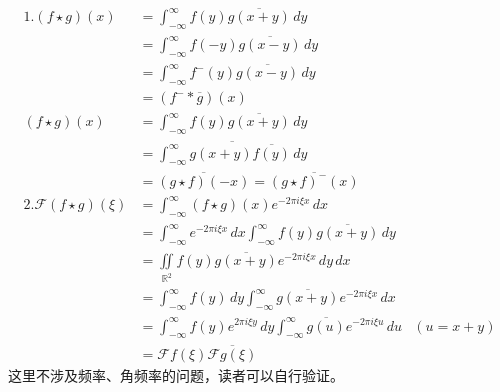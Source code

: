 \documentclass{ctexbook}
\begin{document}
\begin{align*}
    1.(f\star g)(x)               & =\int_{-\infty}^{\infty}f(y)\overline{g(x+y)}\,dy                                                                   \\
                                  & =\int_{-\infty}^{\infty}f(-y)\overline{g(x-y)}\,dy                                                                  \\
                                  & =\int_{-\infty}^{\infty}f^-(y)\overline{g(x-y)}\,dy                                                                 \\
                                  & = (f^- * \overline{g})(x)                                                                                           \\
    (f\star g)(x)                 & =\int_{-\infty}^{\infty}f(y)\overline{g(x+y)}\,dy                                                                   \\
                                  & =\overline{\int_{-\infty}^{\infty}g(x+y)\overline{f(y)}\,dy}                                                        \\
                                  & =\overline{(g\star f)(-x)}=\overline{(g\star f)^-(x)}                                                               \\
    2.\mathcal{F} (f\star g)(\xi) & =\int_{-\infty}^{\infty}(f\star g)(x)e^{-2\pi i\xi x}\,dx                                                           \\
                                  & =\int_{-\infty}^{\infty}e^{-2\pi i\xi x}\,dx\int_{-\infty}^{\infty}f(y)\overline{g(x+y)}\,dy                        \\
                                  & =\iint\limits_{\mathbb{R}^2}f(y)\overline{g(x+y)}e^{-2\pi i\xi x}\,dy\,dx                                           \\
                                  & =\int_{-\infty}^{\infty}f(y)\,dy\int_{-\infty}^{\infty}\overline{g(x+y)}e^{-2\pi i\xi x}\,dx                        \\
                                  & =\int_{-\infty}^{\infty}f(y)e^{2\pi i\xi y}\,dy\int_{-\infty}^{\infty}\overline{g(u)}e^{-2\pi i\xi u}\,du & (u=x+y) \\
                                  & =\mathcal{F} f(\xi)\overline{\mathcal{F} g(\xi)}
\end{align*}这里不涉及频率、角频率的问题，读者可以自行验证。
\end{document}

